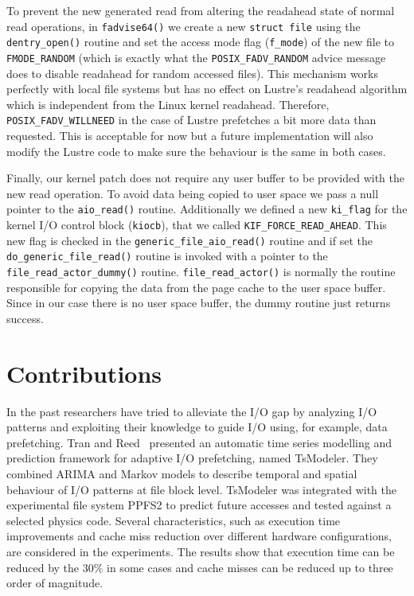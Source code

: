 To prevent the new generated read from altering the readahead state of normal read operations, in \texttt{fadvise64()} we create a new \texttt{struct file} using the \texttt{dentry\_open()} routine and set the access mode flag (\texttt{f\_mode}) of the 
new file to \texttt{FMODE\_RANDOM} (which is exactly what the \texttt{POSIX\_FADV\_RANDOM} advice message does to disable readahead for random accessed files). This mechanism works perfectly with local file systems but has no effect on Lustre's readahead 
algorithm which is independent from the Linux kernel readahead. Therefore, \texttt{POSIX\_FADV\_WILLNEED} in the case of Lustre prefetches a bit more data than requested. This is acceptable for now but a future implementation will also modify the Lustre 
code to make sure the behaviour is the same in both cases.

Finally, our kernel patch does not require any user buffer to be provided with the new read operation. To avoid data being copied to user space we pass a null pointer to the \texttt{aio\_read()} routine. Additionally we defined a new \texttt{ki\_flag} 
for the kernel I/O control block (\texttt{kiocb}), that we called \texttt{KIF\_FORCE\_READ\_AHEAD}. This new flag is checked in the \texttt{generic\_file\_aio\_read()} routine and if set the \texttt{do\_generic\_file\_read()} routine is invoked with a 
pointer to the \texttt{file\_read\_actor\_dummy()} routine. \texttt{file\_read\_actor()} is normally the routine responsible for copying the data from the page cache to the user space buffer. Since in our case there is no user space buffer, the dummy 
routine just returns success.

\section{Contributions} \label{section: mercury_related_work}
In the past researchers have tried to alleviate the I/O gap by analyzing I/O patterns and exploiting their knowledge to guide I/O using, for example, data prefetching. Tran and Reed~\cite{TranR04} presented an automatic 
time series modelling and prediction framework for adaptive I/O prefetching, named TsModeler. They combined ARIMA and Markov models to describe temporal and spatial behaviour of I/O patterns at file block level. TsModeler 
was integrated with the experimental file system PPFS2 to predict future accesses and tested against a selected physics code. Several characteristics, such as execution time improvements and cache miss reduction over different 
hardware configurations, are considered in the experiments. The results show that execution time can be reduced by the 30\% in some cases and cache misses can be reduced up to three order of magnitude. 

